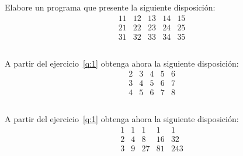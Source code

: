 \documentclass[spanish,addpoints,answers,a4paper]{exam}
\begin{document}
\begin{questions}

\question Elabore un programa que presente la siguiente disposición:\label{q:1}
\begin{equation*}
	\begin{matrix}
	11 & 12 & 13 & 14 & 15 \\
	21 & 22 & 23 & 24 & 25 \\
	31 & 32 & 33 & 34 & 35
	\end{matrix}
\end{equation*}

\begin{solution}
	\begin{listing}[H]
		\footnotesize
		\inputminted{cpp}{1_b.cc}
		\caption{Programa \texttt{1\textunderscore b.cc}.}
		\label{lst:3.1b}
	\end{listing}
\end{solution}

\question A partir del ejercicio~\ref{q:1} obtenga ahora la siguiente disposición:
\begin{equation*}
	\begin{matrix}
	2 & 3 & 4 & 5 & 6 \\
	3 & 4 & 5 & 6 & 7 \\
	4 & 5 & 6 & 7 & 8
	\end{matrix}
\end{equation*}

\begin{solution}
	\begin{listing}[H]
		\footnotesize
		\inputminted{cpp}{2_b.cc}
		\caption{Programa \texttt{2\textunderscore b.cc}.}
		\label{lst:3.2b}
	\end{listing}
\end{solution}

\question A partir del ejercicio~\ref{q:1} obtenga ahora la siguiente disposición:
\begin{equation*}
	\begin{matrix}
	1 & 1 & 1 & 1 & 1 \\
	2 & 4 & 8 & 16 & 32 \\
	3 & 9 & 27 & 81 & 243
	\end{matrix}
\end{equation*}

\begin{solution}
	\begin{listing}[H]
		\footnotesize
		\inputminted{cpp}{3_b.cc}
		\caption{Programa \texttt{3\textunderscore b.cc}.}
		\label{lst:3.3b}
	\end{listing}
\end{solution}


\end{questions}
\end{document}
